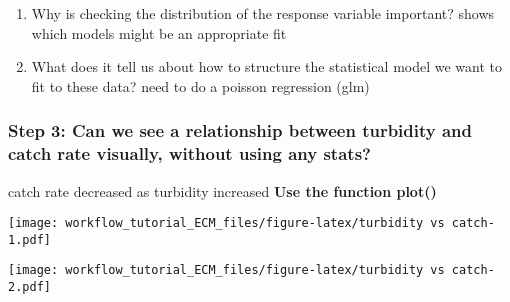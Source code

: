 \documentclass[]{article}
\newenvironment{Shaded}{\begin{snugshade}}{\end{snugshade}}
\newcommand{\KeywordTok}[1]{\textcolor[rgb]{0.13,0.29,0.53}{\textbf{#1}}}
\newcommand{\NormalTok}[1]{#1}
\newcommand{\OperatorTok}[1]{\textcolor[rgb]{0.81,0.36,0.00}{\textbf{#1}}}
\providecommand{\tightlist}{%
  \setlength{\itemsep}{0pt}\setlength{\parskip}{0pt}}
\begin{document}
\begin{enumerate}
\def\labelenumi{\arabic{enumi}.}
\tightlist
\item
  Why is checking the distribution of the response variable important?
  shows which models might be an appropriate fit
\item
  What does it tell us about how to structure the statistical model we
  want to fit to these data? need to do a poisson regression (glm)
\end{enumerate}

\hypertarget{step-3-can-we-see-a-relationship-between-turbidity-and-catch-rate-visually-without-using-any-stats}{%
\subsubsection{Step 3: Can we see a relationship between turbidity and
catch rate visually, without using any
stats?}\label{step-3-can-we-see-a-relationship-between-turbidity-and-catch-rate-visually-without-using-any-stats}}

catch rate decreased as turbidity increased \textbf{Use the function
plot()}

\begin{Shaded}
\end{Shaded}

\texttt{[image: workflow\_tutorial\_ECM\_files/figure-latex/turbidity vs catch-1.pdf]}

\begin{Shaded}
\end{Shaded}

\texttt{[image: workflow\_tutorial\_ECM\_files/figure-latex/turbidity vs catch-2.pdf]}

\begin{Shaded}
\end{Shaded}
\end{document}
